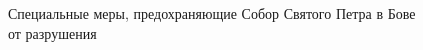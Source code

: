 \begin{figure}
\centering
{}
\caption{Специальные меры, предохраняющие Собор Святого Петра в Бове от разрушения}
\end{figure}
